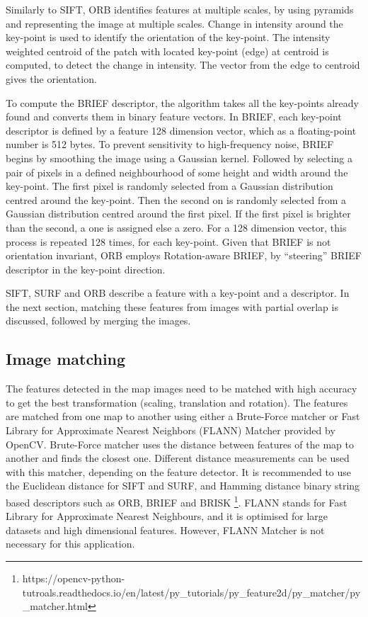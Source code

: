 Similarly to SIFT, ORB identifies features at multiple scales, by using pyramids and representing the image at multiple scales. Change in intensity around the key-point is used to identify the orientation of the key-point. The intensity weighted centroid of the patch with located key-point (edge) at centroid is computed, to detect the change in intensity. The vector from the edge to centroid gives the orientation.

To compute the BRIEF descriptor, the algorithm takes all the key-points already found and converts them in binary feature vectors. In BRIEF, each key-point descriptor is defined by a feature 128 dimension vector, which as a floating-point number is 512 bytes. To prevent sensitivity to high-frequency noise, BRIEF begins by smoothing the image using a Gaussian kernel. Followed by selecting a pair of pixels in a defined neighbourhood of some height and width around the key-point. The first pixel is randomly selected from a Gaussian distribution centred around the key-point. Then the second on is randomly selected from a Gaussian distribution centred around the first pixel. If the first pixel is brighter than the second, a one is assigned else a zero. For a 128 dimension vector, this process is repeated 128 times, for each key-point. Given that BRIEF is not orientation invariant, ORB employs Rotation-aware BRIEF, by ``steering'' BRIEF descriptor in the key-point direction.

SIFT, SURF and ORB describe a feature with a key-point and a descriptor. In the next section, matching these features from images with partial overlap is discussed, followed by merging the images.

\subsection{Image matching}

The features detected in the map images need to be matched with high accuracy to get the best transformation (scaling, translation and rotation). The features are matched from one map to another using either a Brute-Force matcher or Fast Library for Approximate Nearest Neighbors (FLANN) Matcher provided by OpenCV. Brute-Force matcher uses the distance between features of the map to another and finds the closest one. Different distance measurements can be used with this matcher, depending on the feature detector. It is recommended to use the Euclidean distance for SIFT and SURF, and Hamming distance binary string based descriptors such as ORB, BRIEF and BRISK \footnote{https://opencv-python-tutroals.readthedocs.io/en/latest/py\_tutorials/py\_feature2d/py\_matcher/py\_matcher.html}. FLANN stands for Fast Library for Approximate Nearest Neighbours, and it is optimised for large datasets and high dimensional features. However, FLANN Matcher is not necessary for this application.

